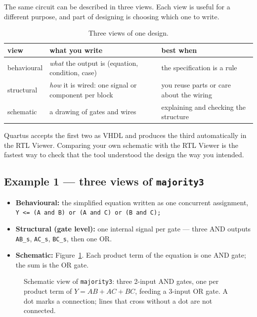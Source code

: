 The same circuit can be described in three views. Each view is useful for a
different purpose, and part of designing is choosing which one to write.

\begin{table}[H]
\centering
\caption{Three views of one design.}
\label{tab:lab00-views}
\small
\begin{tabular}{l>{\raggedright\arraybackslash}p{6.2cm}>{\raggedright\arraybackslash}p{4.8cm}}
\toprule
view & what you write & best when \\
\midrule
behavioural & \emph{what} the output is (equation, condition, case) & the specification is a rule \\
structural  & \emph{how} it is wired: one signal or component per block & you reuse parts or care about the wiring \\
schematic   & a drawing of gates and wires & explaining and checking the structure \\
\bottomrule
\end{tabular}
\end{table}

Quartus accepts the first two as VHDL and produces the third automatically in the
RTL Viewer. Comparing your own schematic with the RTL Viewer is the fastest way to
check that the tool understood the design the way you intended.

\subsection{Example 1 --- three views of \texttt{majority3}}

\begin{itemize}[leftmargin=1.5em]
\item \textbf{Behavioural:} the simplified equation written as one concurrent
assignment, \texttt{Y <= (A and B) or (A and C) or (B and C);}
\item \textbf{Structural (gate level):} one internal signal per gate --- three AND
outputs \texttt{AB\_s}, \texttt{AC\_s}, \texttt{BC\_s}, then one OR.
\item \textbf{Schematic:} Figure~\ref{fig:lab00-maj-sch}. Each product term of the
equation is one AND gate; the sum is the OR gate.
\end{itemize}

\begin{figure}[H]
\centering

\caption{Schematic view of \texttt{majority3}: three 2-input AND gates, one per
product term of $Y = AB + AC + BC$, feeding a 3-input OR gate. A dot marks a
connection; lines that cross without a dot are not connected.}
\label{fig:lab00-maj-sch}
\end{figure}

